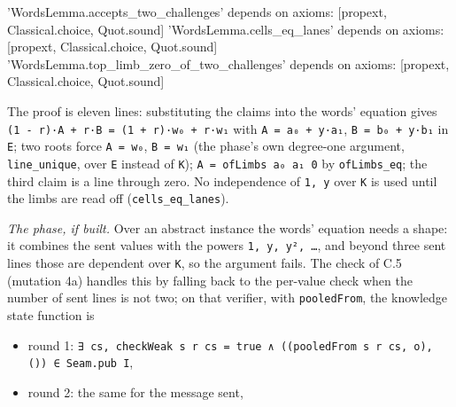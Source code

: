 \begin{srccode}
'WordsLemma.accepts_two_challenges' depends on axioms: [propext, Classical.choice, Quot.sound]
'WordsLemma.cells_eq_lanes' depends on axioms: [propext, Classical.choice, Quot.sound]
'WordsLemma.top_limb_zero_of_two_challenges' depends on axioms: [propext, Classical.choice, Quot.sound]
\end{srccode}

The proof is eleven lines: substituting the claims into the words' equation gives \texttt{(\allowbreak{}1\allowbreak{} -{}\allowbreak{} r\allowbreak{})\allowbreak{}·\allowbreak{}A\allowbreak{} +\allowbreak{} r\allowbreak{}·\allowbreak{}B\allowbreak{} =\allowbreak{} (\allowbreak{}1\allowbreak{} +\allowbreak{} r\allowbreak{})\allowbreak{}·\allowbreak{}w\allowbreak{}₀\allowbreak{} +\allowbreak{} r\allowbreak{}·\allowbreak{}w\allowbreak{}₁} with \texttt{A = a₀ + y·a₁}, \texttt{B = b₀ + y·b₁} in \texttt{E}; two roots force \texttt{A = w₀}, \texttt{B = w₁} (the phase's own degree-one argument, \texttt{line\_\allowbreak{}unique}, over \texttt{E} instead of \texttt{K}); \texttt{A = ofLimbs a₀ a₁ 0} by \texttt{ofLimbs\_\allowbreak{}eq}; the third claim is a line through zero. No independence of \texttt{1,\allowbreak{} y} over \texttt{K} is used until the limbs are read off (\texttt{cells\_\allowbreak{}eq\_\allowbreak{}lanes}).

\emph{The phase, if built.} Over an abstract instance the words' equation needs a shape: it combines the sent values with the powers \texttt{1,\allowbreak{} y,\allowbreak{} y²,\allowbreak{} …}, and beyond three sent lines those are dependent over \texttt{K}, so the argument fails. The check of C.5 (mutation 4a) handles this by falling back to the per-value check when the number of sent lines is not two; on that verifier, with \texttt{pooledFrom}, the knowledge state function is

\begin{itemize}
\item round 1: \texttt{∃\allowbreak{} c\allowbreak{}s\allowbreak{},\allowbreak{} c\allowbreak{}h\allowbreak{}e\allowbreak{}c\allowbreak{}k\allowbreak{}W\allowbreak{}e\allowbreak{}a\allowbreak{}k\allowbreak{} s\allowbreak{} r\allowbreak{} c\allowbreak{}s\allowbreak{} =\allowbreak{} t\allowbreak{}r\allowbreak{}u\allowbreak{}e\allowbreak{} ∧\allowbreak{} (\allowbreak{}(\allowbreak{}p\allowbreak{}o\allowbreak{}o\allowbreak{}l\allowbreak{}e\allowbreak{}d\allowbreak{}F\allowbreak{}r\allowbreak{}o\allowbreak{}m\allowbreak{} s\allowbreak{} r\allowbreak{} c\allowbreak{}s\allowbreak{},\allowbreak{} o\allowbreak{})\allowbreak{},\allowbreak{} (\allowbreak{})\allowbreak{})\allowbreak{} ∈\allowbreak{} S\allowbreak{}e\allowbreak{}a\allowbreak{}m\allowbreak{}.\allowbreak{}p\allowbreak{}u\allowbreak{}b\allowbreak{} I},
\item round 2: the same for the message sent,
\end{itemize}


